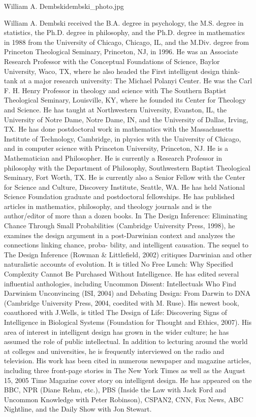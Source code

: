 \begin{authorbio}{William A. Dembski}{dembski_photo.jpg}

William A. Dembski received the B.A. degree in psychology, the M.S. degree in statistics, the
Ph.D. degree in philosophy, and the Ph.D. degree in mathematics in 1988 from the University of
Chicago, Chicago, IL, and the M.Div. degree from Princeton Theological Seminary, Princeton,
NJ, in 1996. He was an Associate Research Professor with the Conceptual Foundations of Science, 
Baylor University, Waco, TX, where he also headed the First intelligent design think-tank
at a major research university: The Michael Polanyi Center. He was the Carl F. H. Henry Professor 
in theology and science with The Southern Baptist Theological Seminary, Louisville, KY,
where he founded its Center for Theology and Science. He has taught at Northwestern University, 
Evanston, IL, the University of Notre Dame, Notre Dame, IN, and the University of Dallas,
Irving, TX. He has done postdoctoral work in mathematics with the Massachusetts Institute of
Technology, Cambridge, in physics with the University of Chicago, and in computer science with
Princeton University, Princeton, NJ. He is a Mathematician and Philosopher. He is currently a
Research Professor in philosophy with the Department of Philosophy, Southwestern Baptist Theological 
Seminary, Fort Worth, TX. He is currently also a Senior Fellow with the Center for Science
and Culture, Discovery Institute, Seattle, WA. He has held National Science Foundation graduate
and postdoctoral fellowships. He has published articles in mathematics, philosophy, and theology
journals and is the author/editor of more than a dozen books. In The Design Inference: Eliminating 
Chance Through Small Probabilities (Cambridge University Press, 1998), he examines the
design argument in a post-Darwinian context and analyzes the connections linking chance, proba-
bility, and intelligent causation. The sequel to The Design Inference (Rowman \& Littlefield, 2002)
critiques Darwinian and other naturalistic accounts of evolution. It is titled No Free Lunch: Why
Specified Complexity Cannot Be Purchased Without Intelligence. He has edited several influential
anthologies, including Uncommon Dissent: Intellectuals Who Find Darwinism Unconvincing (ISI,
2004) and Debating Design: From Darwin to DNA (Cambridge University Press, 2004, coedited
with M. Ruse). His newest book, coauthored with J.Wells, is titled The Design of Life: Discovering
Signs of Intelligence in Biological Systems (Foundation for Thought and Ethics, 2007). His area
of interest in intelligent design has grown in the wider culture; he has assumed the role of public
intellectual. In addition to lecturing around the world at colleges and universities, he is frequently
interviewed on the radio and television. His work has been cited in numerous newspaper and
magazine articles, including three front-page stories in The New York Times as well as the August
15, 2005 Time Magazine cover story on intelligent design. He has appeared on the BBC, NPR
(Diane Rehm, etc.), PBS (Inside the Law with Jack Ford and Uncommon Knowledge with Peter
Robinson), CSPAN2, CNN, Fox News, ABC Nightline, and the Daily Show with Jon Stewart.
\end{authorbio}

